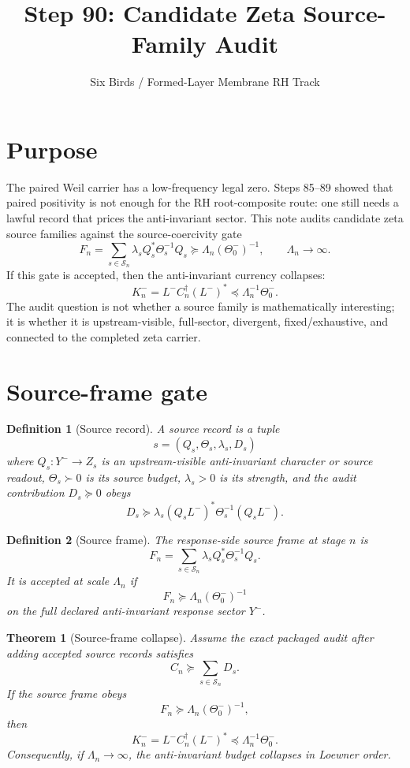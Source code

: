 \documentclass[11pt]{article}
\title{Step 90: Candidate Zeta Source-Family Audit}
\author{Six Birds / Formed-Layer Membrane RH Track}
\date{}
\newtheorem{theorem}{Theorem}
\newtheorem{definition}{Definition}
\begin{document}
\maketitle

\section{Purpose}
The paired Weil carrier has a low-frequency legal zero.  Steps 85--89 showed that paired positivity is not enough for the RH root-composite route: one still needs a lawful record that prices the anti-invariant sector.  This note audits candidate zeta source families against the source-coercivity gate
\[
F_n=\sum_{s\in\mathcal S_n}\lambda_s Q_s^*\Theta_s^{-1}Q_s
\succeq
\Lambda_n(\Theta_0^-)^{-1},
\qquad
\Lambda_n\to\infty.
\]
If this gate is accepted, then the anti-invariant currency collapses:
\[
K_n^- = L^- C_n^\dagger (L^-)^* \preceq \Lambda_n^{-1}\Theta_0^-.
\]
The audit question is not whether a source family is mathematically interesting; it is whether it is upstream-visible, full-sector, divergent, fixed/exhaustive, and connected to the completed zeta carrier.

\section{Source-frame gate}
\begin{definition}[Source record]
A source record is a tuple
\[
s=(Q_s,\Theta_s,\lambda_s,D_s)
\]
where \(Q_s:Y^-\to Z_s\) is an upstream-visible anti-invariant character or source readout, \(\Theta_s\succ0\) is its source budget, \(\lambda_s>0\) is its strength, and the audit contribution \(D_s\succeq0\) obeys
\[
D_s\succeq \lambda_s(Q_sL^-)^*\Theta_s^{-1}(Q_sL^-).
\]
\end{definition}

\begin{definition}[Source frame]
The response-side source frame at stage \(n\) is
\[
F_n=\sum_{s\in\mathcal S_n}\lambda_s Q_s^*\Theta_s^{-1}Q_s.
\]
It is accepted at scale \(\Lambda_n\) if
\[
F_n\succeq \Lambda_n(\Theta_0^-)^{-1}
\]
on the full declared anti-invariant response sector \(Y^-\).
\end{definition}

\begin{theorem}[Source-frame collapse]
Assume the exact packaged audit after adding accepted source records satisfies
\[
C_n\succeq \sum_{s\in\mathcal S_n}D_s.
\]
If the source frame obeys
\[
F_n\succeq \Lambda_n(\Theta_0^-)^{-1},
\]
then
\[
K_n^-=L^-C_n^\dagger(L^-)^*\preceq \Lambda_n^{-1}\Theta_0^-.
\]
Consequently, if \(\Lambda_n\to\infty\), the anti-invariant budget collapses in Loewner order.
\end{theorem}
\end{document}
